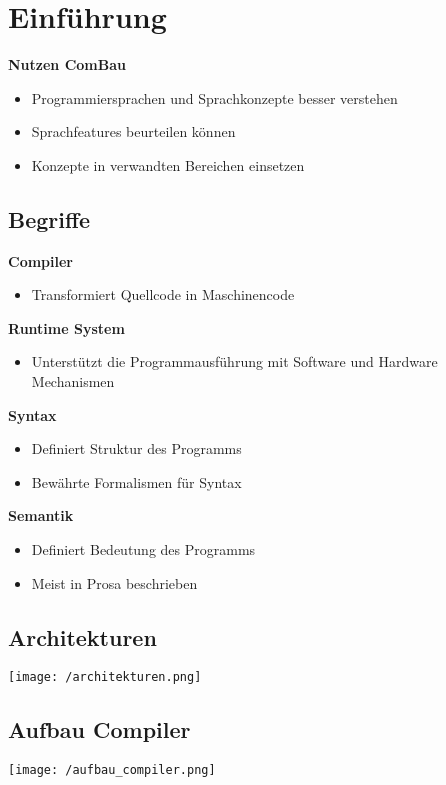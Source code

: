 
\section{Einführung}
\textbf{Nutzen ComBau}
\begin{itemize}
    \item Programmiersprachen und Sprachkonzepte besser verstehen
    \item Sprachfeatures beurteilen können
    \item Konzepte in verwandten Bereichen einsetzen
\end{itemize}

\subsection{Begriffe}
\textbf{Compiler}
\begin{itemize}
    \item Transformiert Quellcode in Maschinencode
\end{itemize}
\textbf{Runtime System}
\begin{itemize}
    \item Unterstützt die Programmausführung mit Software und Hardware Mechanismen
\end{itemize}
\textbf{Syntax}
\begin{itemize}
    \item Definiert Struktur des Programms
    \item Bewährte Formalismen für Syntax
\end{itemize}
\textbf{Semantik}
\begin{itemize}
    \item Definiert Bedeutung des Programms
    \item Meist in Prosa beschrieben
\end{itemize}

\subsection{Architekturen}
\begin{center}
    \texttt{[image: /architekturen.png]} 
\end{center}

\subsection{Aufbau Compiler}
\begin{center}
    \texttt{[image: /aufbau\_compiler.png]} 
\end{center}
